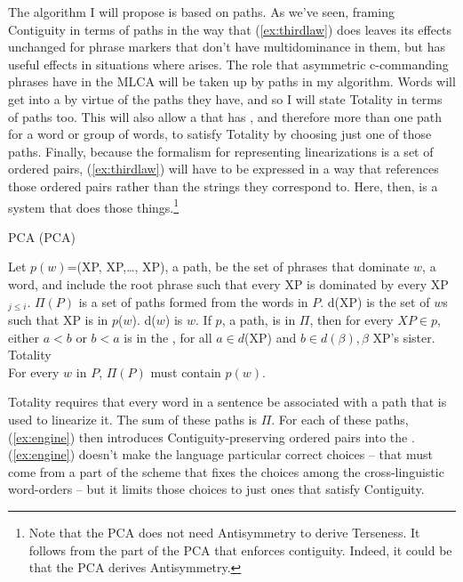 \documentclass[output=paper]{langsci/langscibook}
\begin{document}
The  algorithm I will propose is based on paths. As we've seen,
framing Contiguity in terms of paths in the way that (\ref{ex:thirdlaw}) does
leaves its effects unchanged for phrase markers that don't have multidominance
in them, but has useful effects in situations where  arises. The
role that asymmetric c-commanding phrases have in the \gls{MLCA} will be taken
up by paths in my algorithm. Words will get into a  by virtue of
the paths they have, and so I will state Totality in terms of paths too. This
will also allow a  that has , and therefore more
than one path for a word or group of words, to satisfy Totality by choosing
just one of those paths. Finally, because the formalism for representing
linearizations is a set of ordered pairs, (\ref{ex:thirdlaw}) will have to be
expressed in a way that references those ordered pairs rather than the strings
they correspond to. Here, then, is a system that does those
things.\footnote{Note that the \gls{PCA} does not need Antisymmetry to
derive Terseness. It follows from the part of the \gls{PCA} that enforces
contiguity. Indeed, it could be that the \gls{PCA} derives Antisymmetry.}
\begin{exe}
    \ex \label{ex:pca} \glsdesc{PCA} (\gls{PCA})
	\begin{xlist}
		\ex Let $p(w)$=(XP, XP,\ldots, XP), a path, be the set of phrases that dominate $w$, a word, and include the root phrase such that every XP is dominated by every XP$_{j \leq i}$.
		\ex $\Pi(P)$ is a set of paths formed from the words in $P.$
		\ex d(XP) is the set of $w$s such that XP is in $p$($w$). d($w$) is $w$.
		\ex \label{ex:engine} If $p$, a path, is in $\Pi$, then for every $XP \in p$, either $a<b$ or $b<a$ is in the , for all $a \in d$(XP) and $b \in d(\beta), \beta$ XP's sister.
		\ex Totality\\
		For every $w$ in $P$, $\Pi(P)$ must contain $p(w)$.
	\end{xlist}
\end{exe}

Totality requires that every word in a sentence be associated with a path that is used to linearize it. The sum of these paths is $\Pi$. For each of these paths, (\ref{ex:engine}) then introduces Contiguity-preserving ordered pairs into the . (\ref{ex:engine}) doesn't make the language particular correct choices -- that must come from a part of the  scheme that fixes the choices among the cross-linguistic word-orders -- but it limits those choices to just ones that satisfy Contiguity.
\end{document}

